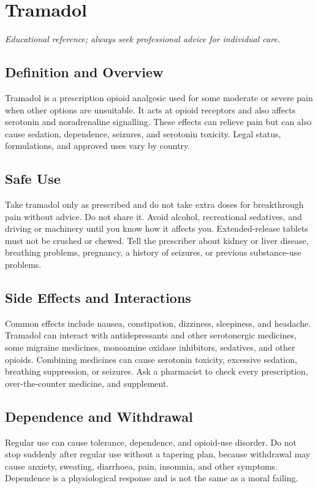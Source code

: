 \chapter{Tramadol}
\medskip
\noindent\textit{Educational reference; always seek professional advice for individual care.}

\section*{Definition and Overview}
Tramadol is a prescription opioid analgesic used for some moderate or severe pain when other options are unsuitable. It acts at opioid receptors and also affects serotonin and noradrenaline signalling. These effects can relieve pain but can also cause sedation, dependence, seizures, and serotonin toxicity. Legal status, formulations, and approved uses vary by country.

\section*{Safe Use}
Take tramadol only as prescribed and do not take extra doses for breakthrough pain without advice. Do not share it. Avoid alcohol, recreational sedatives, and driving or machinery until you know how it affects you. Extended-release tablets must not be crushed or chewed. Tell the prescriber about kidney or liver disease, breathing problems, pregnancy, a history of seizures, or previous substance-use problems.

\section*{Side Effects and Interactions}
Common effects include nausea, constipation, dizziness, sleepiness, and headache. Tramadol can interact with antidepressants and other serotonergic medicines, some migraine medicines, monoamine oxidase inhibitors, sedatives, and other opioids. Combining medicines can cause serotonin toxicity, excessive sedation, breathing suppression, or seizures. Ask a pharmacist to check every prescription, over-the-counter medicine, and supplement.

\section*{Dependence and Withdrawal}
Regular use can cause tolerance, dependence, and opioid-use disorder. Do not stop suddenly after regular use without a tapering plan, because withdrawal may cause anxiety, sweating, diarrhoea, pain, insomnia, and other symptoms. Dependence is a physiological response and is not the same as a moral failing.

